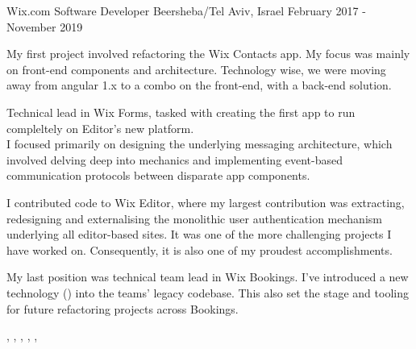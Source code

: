 
\begin{cventries}
  \cventry
    {Wix.com}
    {Software Developer}
    {Beersheba/Tel Aviv, Israel}
    {February 2017 - November 2019}
    {
      \begin{cvitems}
        \item {My first project involved refactoring the Wix Contacts app. My focus was mainly on front-end components and architecture. Technology wise, we were moving away from angular 1.x to a  combo on the front-end, with a  back-end solution. }
        \item {Technical lead in Wix Forms, tasked with creating the first app to run compleltely on Editor's new platform.\\ 
        I focused primarily on designing the underlying messaging architecture, which involved delving deep into  mechanics and implementing event-based communication protocols between disparate app components.}
        \item {I contributed code to Wix Editor, where my largest contribution was extracting, redesigning and externalising the monolithic user authentication mechanism underlying all editor-based sites. It was one of the more challenging projects I have worked on. Consequently, it is also one of my proudest accomplishments.}
        \item {My last position was technical team lead in Wix Bookings. I've introduced a new technology () into the teams' legacy codebase. This also set the stage and tooling for future refactoring projects across Bookings.}
      \end{cvitems}
     }

    \begin{cvskills}
       {, }
       {, , , , }
    \end{cvskills}


\end{cventries}
